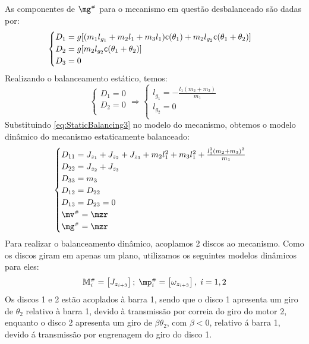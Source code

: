 \documentclass[a4paper,11pt,brazil,fleqn]{article}
\begin{document}
As componentes de $\mg\ssh$ para o mecanismo em quest\~{a}o desbalanceado s\~{a}o dadas por:
\begin{equation}\label{eq:gh3}
\begin{cases}
D_1 = g[ (m_1 l_{g_1} + m_2 l_1 + m_3 l_1 ) \mathsf{c}(\theta_1) + m_2 l_{g_2} \mathsf{c}(\theta_1+\theta_2) ] \\
D_2 = g[ m_2 l_{g_2} \mathsf{c}(\theta_1+\theta_2)  ] \\
D_3 = 0 \\
\end{cases}
\end{equation} 
Realizando o balanceamento est\'{a}tico, temos:
\begin{equation}\label{eq:StaticBalancing3}
\begin{cases}
D_1 = 0 \\
D_2 = 0 \\
\end{cases}
\Rightarrow
\begin{cases}
l_{g_1} = -\frac{l_1 (m_2+m_3)}{m_1} \\
l_{g_2} = 0 \\
\end{cases}
\end{equation}
Substituindo \eqref{eq:StaticBalancing3} no modelo do mecanismo, obtemos o modelo din\^{a}mico do mecanismo estaticamente balanceado:
\begin{equation}\label{eq:StaticBalanced3}
\begin{cases}
D_{11} = J_{z_1} + J_{z_2} + J_{z_3} + m_2 l_1^2 + m_3 l_1^2 + \frac{l_1^2 (m_2 + m_3)^2}{m_1} \\
D_{22} = J_{z_2} + J_{z_3} \\
D_{33} = m_3 \\
D_{12} = D_{22} \\
D_{13} = D_{23} = 0 \\
\mv\ssh = \mzr \\
\mg\ssh = \mzr
\end{cases}
\end{equation}
Para realizar o balanceamento din\^{a}mico, acoplamos 2 discos ao mecanismo. Como os discos giram em apenas um plano, utilizamos os seguintes modelos din\^{a}micos para eles:
\begin{equation}\label{eq:DiscsModel3}
\mM\ssh_i = \begin{bmatrix} J_{z_{i+3}} \end{bmatrix}; \; \mp\ssh_i = \begin{bmatrix} \omega_{z_{i+3}} \end{bmatrix}, \; i = 1, 2
\end{equation}
Os discos 1 e 2 est\~{a}o acoplados \`{a} barra 1, sendo que o disco 1 apresenta um giro de $\theta_2$ relativo \`{a} barra 1, devido \`{a} transmiss\~{a}o por correia do giro do motor 2, enquanto o disco 2 apresenta um giro de $\beta\theta_2$, com $\beta < 0$, relativo \'{a} barra 1, devido \'{a} transmiss\~{a}o por engrenagem do giro do disco 1.
\end{document}
